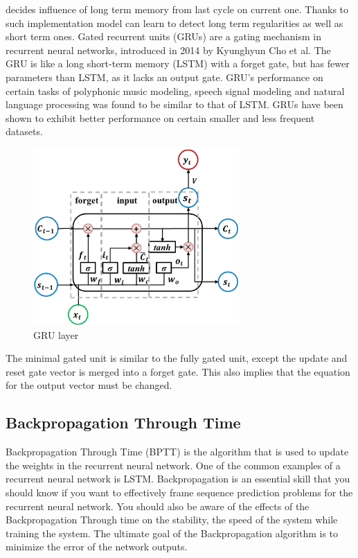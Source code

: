 decides influence of long term memory from last cycle on current one.
Thanks to such implementation model can learn to detect long term regularities as well
as short term ones.
Gated recurrent units (GRUs) are a gating mechanism in recurrent neural networks,
introduced in 2014 by Kyunghyun Cho et al.
The GRU is like a long short-term memory (LSTM) with a forget gate, but has fewer parameters 
than LSTM, as it lacks an output gate. GRU's performance on certain tasks of polyphonic music
modeling, speech signal modeling and natural language processing was found to be similar 
to that of LSTM. GRUs have been shown to exhibit better performance on certain smaller and less
frequent datasets.
\begin{figure}[htb] 
	\label{fig:gru}
	\includegraphics[width=0.7\textwidth]{figures/gru}
	\caption{GRU layer}
\end{figure}
The minimal gated unit is similar to the fully gated unit, except the update and reset gate vector
is merged into a forget gate. This also implies that the equation for the output vector 
must be changed.

\subsection{Backpropagation Through Time}
\FloatBarrier
Backpropagation Through Time (BPTT) is the algorithm that is used to update the weights in the 
recurrent neural network. 
One of the common examples of a recurrent neural network is LSTM. 
Backpropagation is an essential skill that you should know if you want to effectively frame 
sequence prediction problems for the recurrent neural network. You should also be aware of the
effects of the Backpropagation Through time on the stability, the speed of the system while 
training the system.
The ultimate goal of the Backpropagation algorithm is to minimize the error of the network outputs.

